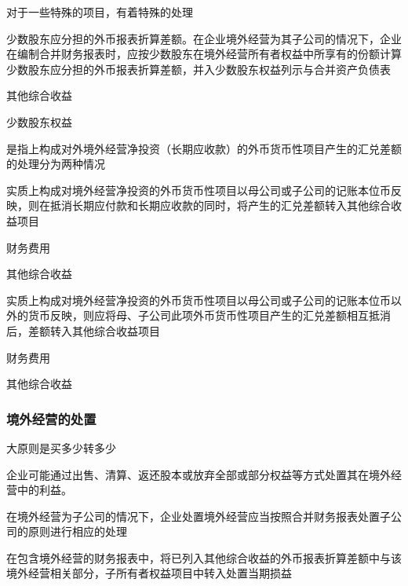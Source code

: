 \documentclass[UTF8,12pt]{ctexart}
\newenvironment{Dr}{%
	\begin{list}{}%
		{
			\setlength{\leftmargin}{2em}
			\setlength{\labelwidth}{2em}
			\setlength{\labelsep}{0pt}
			\setlength{\itemindent}{0pt}
			\setlength{\listparindent}{0pt}
			\setlength{\parsep}{0pt}
			\setlength{\topsep}{0pt}
		}
		\item[\textbf{借：}]
	}{%
	\end{list}
}
\newenvironment{Cr}{%
	\begin{list}{}%
		{
			\setlength{\leftmargin}{2em}
			\setlength{\labelwidth}{2em}
			\setlength{\labelsep}{0pt}
			\setlength{\itemindent}{0pt}
			\setlength{\listparindent}{0pt}
			\setlength{\parsep}{0pt}
			\setlength{\topsep}{0pt}
		}
		\item[\textbf{贷：}]
	}{%
	\end{list}
}
\numberwithin{equation}{section} %
\numberwithin{figure}{section}
\numberwithin{table}{section}
\begin{document}
	对于一些特殊的项目，有着特殊的处理
	\begin{enumerate}
		\item 少数股东应分担的外币报表折算差额。在企业境外经营为其子公司的情况下，企业在编制合并财务报表时，应按少数股东在境外经营所有者权益中所享有的份额计算少数股东应分担的外币报表折算差额，并入少数股东权益列示与合并资产负债表
		\begin{Dr}
			其他综合收益
		\end{Dr}
		\begin{Cr}
			少数股东权益
		\end{Cr}
		
		\item 是指上构成对外境外经营净投资（长期应收款）的外币货币性项目产生的汇兑差额的处理分为两种情况
		\begin{enumerate}
			\item 实质上构成对境外经营净投资的外币货币性项目以母公司或子公司的记账本位币反映，则在抵消长期应付款和长期应收款的同时，将产生的汇兑差额转入其他综合收益项目
			\begin{Dr}
				财务费用
			\end{Dr}
			\begin{Cr}
				其他综合收益
			\end{Cr}
			
			\item 实质上构成对境外经营净投资的外币货币性项目以母公司或子公司的记账本位币以外的货币反映，则应将母、子公司此项外币货币性项目产生的汇兑差额相互抵消后，差额转入其他综合收益项目
			\begin{Dr}
			财务费用
			\end{Dr}
			\begin{Cr}
			其他综合收益
			\end{Cr}
		\end{enumerate}
	\end{enumerate}
	
	\subsubsection{境外经营的处置}
	大原则是买多少转多少
	
	企业可能通过出售、清算、返还股本或放弃全部或部分权益等方式处置其在境外经营中的利益。
	
	在境外经营为子公司的情况下，企业处置境外经营应当按照合并财务报表处置子公司的原则进行相应的处理
	
	在包含境外经营的财务报表中，将已列入其他综合收益的外币报表折算差额中与该境外经营相关部分，子所有者权益项目中转入处置当期损益
	
\end{document}
